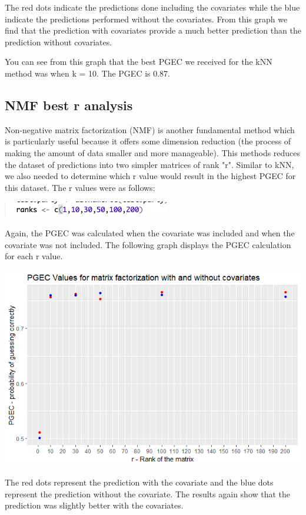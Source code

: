 \documentclass{article}
\begin{document}
The red dots indicate the predictions done including the covariates while the blue indicate the predictions performed without the covariates. From this graph we find that the prediction with covariates provide a much better prediction than the prediction without covariates.

You can see from this graph that the best PGEC we received for the kNN method was when k = 10. The PGEC is 0.87.


\subsection{NMF best r analysis}



Non-negative matrix factorization (NMF) is another fundamental method which is particularly useful because it offers some dimension reduction (the process of making the amount of data smaller and more manageable). This methods reduces the dataset of predictions into two simpler matrices of rank "r". Similar to kNN, we also needed to determine which r value would result in the highest PGEC for this dataset. The r values were as follows:

\includegraphics[]{rrangeofvalues.png}

Again, the PGEC was calculated when the covariate was included and when the covariate was not included. The following graph displays the PGEC calculation for each r value.

\includegraphics[scale = 0.7]{nmfpgec.png}

The red dots represent the prediction with the covariate and the blue dots represent the prediction without the covariate. The results again show that the prediction was slightly better with the covariates.
\end{document}
